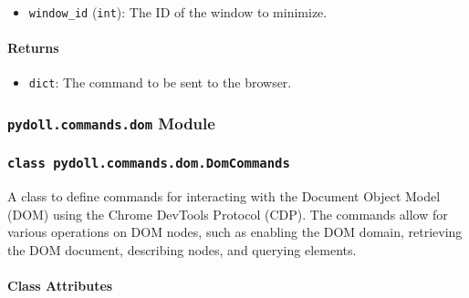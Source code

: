 \documentclass{article}
\begin{document}
\begin{itemize}
    \item \lstinline[style=pythonstyle]|window_id| (\lstinline[style=pythonstyle]|int|): The ID of the window to minimize.
\end{itemize}

\paragraph{Returns}

\begin{itemize}
    \item \lstinline[style=pythonstyle]|dict|: The command to be sent to the browser.
\end{itemize}

\subsubsection*{\texttt{pydoll.commands.dom} Module}

\subsubsection*{\texttt{class pydoll.commands.dom.DomCommands}}
\noindent A class to define commands for interacting with the Document Object Model (DOM) using the Chrome DevTools Protocol (CDP). The commands allow for various operations on DOM nodes, such as enabling the DOM domain, retrieving the DOM document, describing nodes, and querying elements.

\paragraph{Class Attributes}
\end{document}
